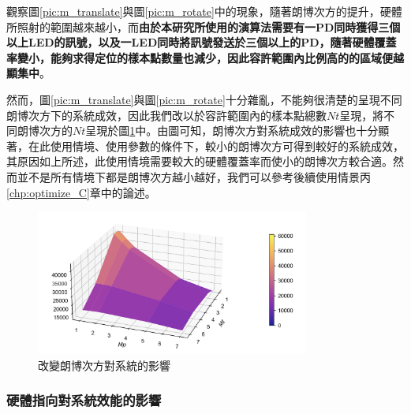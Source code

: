 觀察圖\ref{pic:m_translate}與圖\ref{pic:m_rotate}中的現象，隨著朗博次方的提升，硬體所照射的範圍越來越小，而\textbf{由於本研究所使用的演算法需要有一PD同時獲得三個以上LED的訊號，以及一LED同時將訊號發送於三個以上的PD，隨著硬體覆蓋率變小，能夠求得定位的樣本點數量也減少，因此容許範圍內比例高的的區域便越顯集中}。



然而，圖\ref{pic:m_translate}與圖\ref{pic:m_rotate}十分雜亂，不能夠很清楚的呈現不同朗博次方下的系統成效，因此我們改以於容許範圍內的樣本點總數$Nt$呈現，將不同朗博次方的$Nt$呈現於圖\ref{pic:m alpha50 surface}中。由圖可知，朗博次方對系統成效的影響也十分顯著，在此使用情境、使用參數的條件下，較小的朗博次方可得到較好的系統成效，其原因如上所述，此使用情境需要較大的硬體覆蓋率而使小的朗博次方較合適。然而並不是所有情境下都是朗博次方越小越好，我們可以參考後續使用情景丙\ref{chp:optimize_C}章中的論述。

\begin{figure}[htpb]
    \centering
    \includegraphics[width=9cm]{ch4pic/m alpha50 surface.png}
    \caption{改變朗博次方對系統的影響}
    \label{pic:m alpha50 surface}
\end{figure}










\subsubsection{硬體指向對系統效能的影響}
\label{chp:orient_effect}

